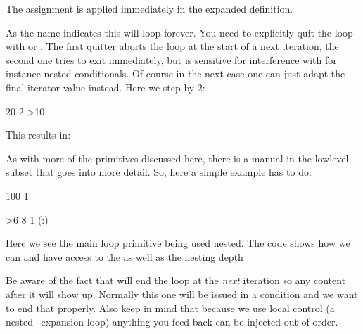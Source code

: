 \start \getbuffer
\starttabulate[|T|T|]
\NC \string\testa \NC \meaningfull\testa \NC \NR
\NC \string\testb \NC \meaningfull\testb \NC \NR
\stoptabulate
\stop

The assignment is applied immediately in the expanded definition.

\stopnewprimitive

\startnewprimitive[title={\prm {localcontrolledendless}}]

As the name indicates this will loop forever. You need to explicitly quit the
loop with  or . The first quitter aborts the
loop at the start of a next iteration, the second one tries to exit immediately,
but is sensitive for interference with for instance nested conditionals. Of
course in the next case one can just adapt the final iterator value instead. Here
we step by 2:

\startbuffer
{} 20 2 {%
    \ifnum\currentloopiterator>10
        \quitloop
    \else
        [!]
    \fi
}
\stopbuffer

\typebuffer

This results in:

\getbuffer

\stopnewprimitive

\startnewprimitive[title={\prm {localcontrolledloop}}]

As with more of the primitives discussed here, there is a manual in the \quote
{lowlevel} subset that goes into more detail. So, here a simple example has to
do:

\startbuffer
{} 100 1 {%
    \ifnum\currentloopiterator>6\relax
        \quitloop
    \else
        [\number\currentloopnesting:\number\currentloopiterator]
         8 1 {%
            (\number\currentloopnesting:\number\currentloopiterator)
        }\par
    \fi
}
\stopbuffer

\typebuffer

Here we see the main loop primitive being used nested. The code shows how we can
 and have access to the  as well as the
nesting depth .

\startpacked \getbuffer \stoppacked

Be aware of the fact that  will end the loop at the {\em next}
iteration so any content after it will show up. Normally this one will be issued
in a condition and we want to end that properly. Also keep in mind that because
we use local control (a nested \TEX\ expansion loop) anything you feed back can
be injected out of order.

